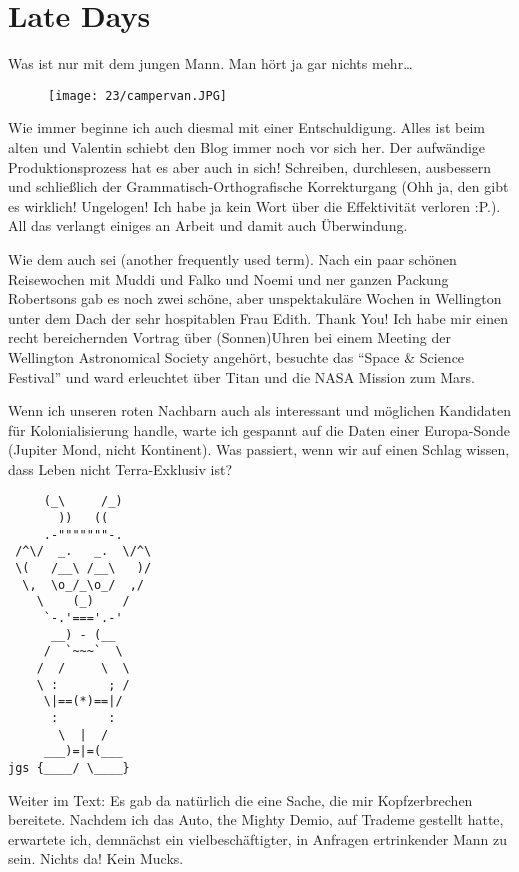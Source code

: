 \chapter{Late Days}

Was ist nur mit dem jungen Mann. Man hört ja gar nichts mehr\ldots{}


\begin{figure}[h]
  \centering
  \texttt{[image: 23/campervan.JPG]}
\end{figure}

Wie immer beginne ich auch diesmal mit einer Entschuldigung. Alles ist
beim alten und Valentin schiebt den Blog immer noch vor sich her. Der
aufwändige Produktionsprozess hat es aber auch in sich! Schreiben,
durchlesen, ausbessern und schließlich der Grammatisch-Orthografische
Korrekturgang (Ohh ja, den gibt es wirklich! Ungelogen! Ich habe ja kein
Wort über die Effektivität verloren :P.). All das verlangt einiges an
Arbeit und damit auch Überwindung.

Wie dem auch sei (another frequently used term). Nach ein paar schönen
Reisewochen mit Muddi und Falko und Noemi und ner ganzen Packung
Robertsons gab es noch zwei schöne, aber unspektakuläre Wochen in
Wellington unter dem Dach der sehr hospitablen Frau Edith. Thank You!
Ich habe mir einen recht bereichernden Vortrag über (Sonnen)Uhren bei
einem Meeting der Wellington Astronomical Society angehört, besuchte das
``Space \& Science Festival'' und ward erleuchtet über Titan und die NASA
Mission zum Mars.

Wenn ich unseren roten Nachbarn auch als interessant und möglichen
Kandidaten für Kolonialisierung handle, warte ich gespannt auf die Daten
einer Europa-Sonde (Jupiter Mond, nicht Kontinent). Was passiert, wenn
wir auf einen Schlag wissen, dass Leben nicht Terra-Exklusiv ist?

\begin{verbatim}
     (_\     /_)
       ))   ((
     .-"""""""-.
 /^\/  _.   _.  \/^\
 \(   /__\ /__\   )/
  \,  \o_/_\o_/  ,/
    \    (_)    /
     `-.'==='.-'
      __) - (__
     /  `~~~`  \
    /  /     \  \
    \ :       ; /
     \|==(*)==|/
      :       :
       \  |  /
     ___)=|=(___
jgs {____/ \____}
\end{verbatim}

Weiter im Text: Es gab da natürlich die eine Sache, die mir
Kopfzerbrechen bereitete. Nachdem ich das Auto, the Mighty Demio, auf
Trademe gestellt hatte, erwartete ich, demnächst ein
vielbeschäftigter, in Anfragen ertrinkender Mann zu sein. Nichts da!
Kein Mucks.

